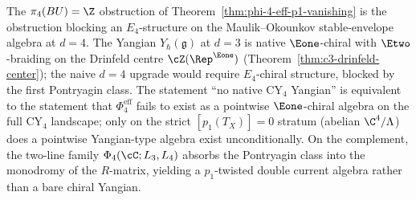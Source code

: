 \begin{remark}
\label{rem:cy4-no-native-yangian-bridge}
The $\pi_4(BU) = \Z$ obstruction of
Theorem~\ref{thm:phi-4-eff-p1-vanishing} is the obstruction blocking an
$E_4$-structure on the Maulik--Okounkov stable-envelope algebra at $d = 4$.
The Yangian $Y_\hbar(\mathfrak{g})$ at $d = 3$ is native $\Eone$-chiral with
$\Etwo$-braiding on the Drinfeld centre
$\cZ(\Rep^{\Eone})$
\textup{(}Theorem~\ref{thm:c3-drinfeld-center}\textup{)}; the naive $d = 4$
upgrade would require $E_4$-chiral structure, blocked by the first Pontryagin
class. The statement ``no native CY${}_4$ Yangian'' is equivalent to the
statement that $\Phi_4^{\mathrm{eff}}$ fails to exist as a pointwise
$\Eone$-chiral algebra on the full CY${}_4$ landscape; only on the strict
$[p_1(T_X)] = 0$ stratum \textup{(}abelian $\C^4/\Lambda$\textup{)} does a
	pointwise Yangian-type algebra exist unconditionally. On the complement, the
	two-line family \(\Phi_4(\cC;L_3,L_4)\) absorbs the Pontryagin class into the
monodromy of the $R$-matrix, yielding a $p_1$-twisted double current
algebra rather than a bare chiral Yangian.
\end{remark}

